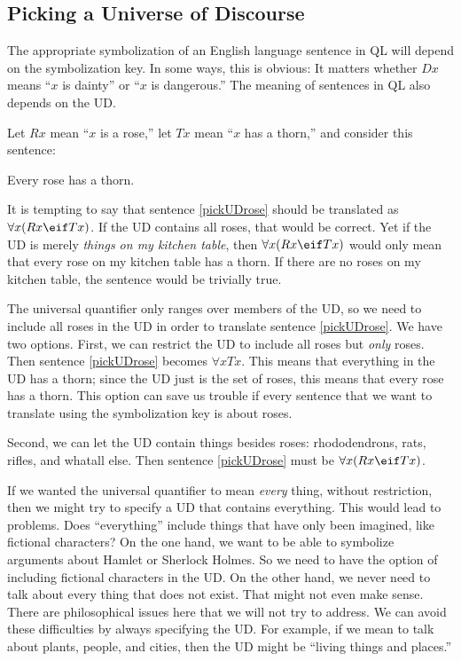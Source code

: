 
\subsection{Picking a Universe of Discourse}

The appropriate symbolization of an English language sentence in QL will depend on the symbolization key. In some ways, this is obvious: It matters whether $Dx$ means ``$x$ is dainty'' or ``$x$ is dangerous.'' The meaning of sentences in QL also depends on the UD.

Let $Rx$ mean ``$x$ is a rose,'' let $Tx$ mean ``$x$ has a thorn,'' and consider this sentence:
\begin{kormanize}
\item[\ex{pickUDrose}] Every rose has a thorn.
\end{kormanize}

It is tempting to say that sentence \ref{pickUDrose} should be translated as $\forall x(Rx \eif Tx)$. If the UD contains all roses, that would be correct. Yet if the UD is merely \emph{things on my kitchen table}, then $\forall x(Rx \eif Tx)$ would only mean that every rose on my kitchen table has a thorn. If there are no roses on my kitchen table, the sentence would be trivially true.

The universal quantifier only ranges over members of the UD, so we need to include all roses in the UD in order to translate sentence \ref{pickUDrose}. We have two options. First, we can restrict the UD to include all roses but \emph{only} roses. Then sentence \ref{pickUDrose} becomes $\forall x Tx$. This means that everything in the UD has a thorn; since the UD just is the set of roses, this means that every rose has a thorn. This option can save us trouble if every sentence that we want to translate using the symbolization key is about roses.

Second, we can let the UD contain things besides roses: rhododendrons, rats, rifles, and whatall else. Then sentence \ref{pickUDrose} must be $\forall x(Rx \eif Tx)$.

If we wanted the universal quantifier to mean \emph{every} thing, without restriction, then we might try to specify a UD that contains everything. This would lead to problems. Does ``everything'' include things that have only been imagined, like fictional characters? On the one hand, we want to be able to symbolize arguments about Hamlet or Sherlock Holmes. So we need to have the option of including fictional characters in the UD. On the other hand, we never need to talk about every thing that does not exist. That might not even make sense. There are philosophical issues here that we will not try to address. We can avoid these difficulties by always specifying the UD. For example, if we mean to talk about plants, people, and cities, then the UD might be ``living things and places.''

